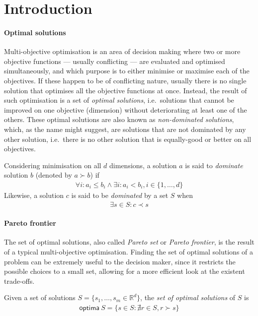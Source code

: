 \section{Introduction}

\paragraph{Optimal solutions} Multi-objective optimisation is an area of decision making where two or more objective functions --- usually conflicting --- are evaluated and optimised simultaneously, and which purpose is to either minimise or maximise each of the objectives. If these happen to be of conflicting nature, usually there is no single solution that optimises all the objective functions at once. Instead, the result of such optimisation is a set of \textit{optimal solutions}, i.e.\ solutions that cannot be improved on one objective (dimension) without deteriorating at least one of the others. These optimal solutions are also known as \textit{non-dominated solutions}, which, as the name might suggest, are solutions that are not dominated by any other solution, i.e.\ there is no other solution that is equally-good or better on all objectives.

\begin{defn}
Considering minimisation on all $d$ dimensions, a solution $a$ is said to \textit{dominate} solution $b$ (denoted by $a \succ b$) if
\begin{align*}
\forall i: a_i \leq b_i \land \exists i: a_i < b_i, i \in \{1,\dotsc,d\}
\end{align*}
Likewise, a solution $c$ is said to be \textit{dominated} by a set $S$ when
\begin{align*}
\exists s \in S: c \prec s
\end{align*}
\end{defn}

\paragraph{Pareto frontier} The set of optimal solutions, also called \textit{Pareto set} or \textit{Pareto frontier}, is the result of a typical multi-objective optimisation. Finding the set of optimal solutions of a problem can be extremely useful to the decision maker, since it restricts the possible choices to a small set, allowing for a more efficient look at the existent trade-offs.

\begin{defn} 
Given a set of solutions $S = \{s_1,\dotsc,s_m \in \mathbb{R}^d\}$, the \textit{set of optimal solutions} of $S$ is
\begin{align*}
\mathsf{optima}\ S = \{s \in S: \nexists r \in S, r \succ s\}
\end{align*}
\end{defn}

